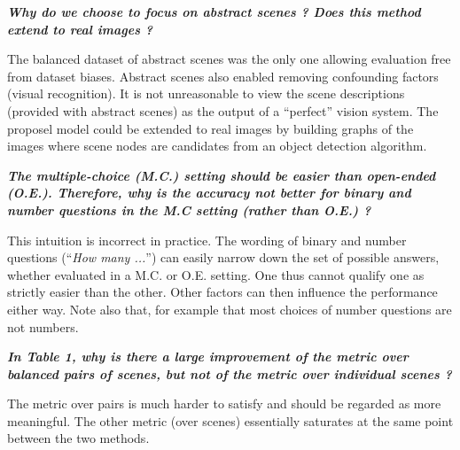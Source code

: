 \noindent\textbf{\textit{Why do we choose to focus on abstract scenes ? Does this method extend to real images ?}}



\noindent
The balanced dataset of abstract scenes was the only one allowing evaluation free from dataset biases. Abstract scenes also enabled removing confounding factors (visual recognition). It is not unreasonable to view the scene descriptions (provided with abstract scenes) as the output of a ``perfect'' vision system. The proposel model could be extended to real images by building graphs of the images where scene nodes are candidates from an object detection algorithm.



\vspace{5pt}
\noindent\textbf{\textit{The multiple-choice (M.C.) setting should be easier than open-ended (O.E.). Therefore, why is the accuracy not better for binary and number questions in the M.C setting (rather than O.E.) ?}}

\noindent
This intuition is incorrect in practice. The wording of binary and number questions (``\textit{How many ...}'') can easily narrow down the set of possible answers, whether evaluated in a M.C. or O.E. setting. One thus cannot qualify one as strictly easier than the other. Other factors can then influence the performance either way. Note also that, for example that most choices of number questions are not numbers.


\vspace{5pt}
\noindent\textbf{\textit{In Table 1, why is there a large improvement of the metric over balanced pairs of scenes, but not of the metric over individual scenes ?}}

\noindent
The metric over pairs is much harder to satisfy and should be regarded as more meaningful. The other metric (over scenes) essentially saturates at the same point between the two methods.

